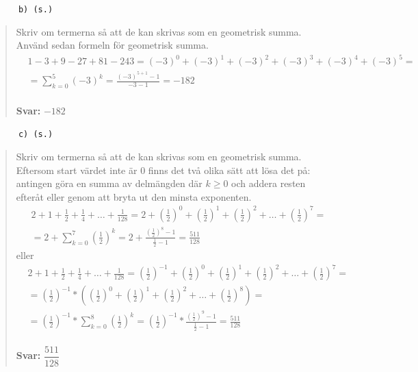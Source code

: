 \documentclass[a4paper]{article}
\newcommand{\tskcol}[1]{\textcolor{tskcol}{#1}}
\begin{document}
	\texttt{\tskcol{~~~~~~b) (s.)}}
	\begin{quotation}
		\noindent
		Skriv om termerna så att de kan skrivas som en geometrisk summa. Använd sedan formeln för geometrisk summa.
		\begin{align*}
		&1-3+9-27+81-243=
		(-3)^0+(-3)^1+(-3)^2+(-3)^3+(-3)^4+(-3)^5= \\
		&=\sum_{k=0}^{5}(-3)^k=
		\frac{(-3)^{5+1}-1}{-3-1}=
		-182
		\end{align*}
		\\
		\textbf{Svar:} $-182$
	\end{quotation}
	
	\texttt{\tskcol{~~~~~~c) (s.)}}
	\begin{quotation}
		\noindent
		Skriv om termerna så att de kan skrivas som en geometrisk summa. Eftersom start värdet inte är $0$ finns det två olika sätt att lösa det på: antingen göra en summa av delmängden där $k \ge 0$ och addera resten efteråt eller genom att bryta ut den minsta exponenten.
		\begin{align*}
		&2+1+\frac{1}{2}+\frac{1}{4}+\ldots+\frac{1}{128}=
		2+\left(\tfrac{1}{2}\right)^0+\left(\tfrac{1}{2}\right)^1+\left(\tfrac{1}{2}\right)^2+\ldots+\left(\tfrac{1}{2}\right)^7= \\
		&=2+\sum_{k=0}^{7}\left(\tfrac{1}{2}\right)^k=
		2+\frac{\left(\frac{1}{2}\right)^8-1}{\frac{1}{2}-1}=
		\frac{511}{128}
		\end{align*}
		eller \begin{align*}
		&2+1+\frac{1}{2}+\frac{1}{4}+\ldots+\frac{1}{128}=
		\left(\tfrac{1}{2}\right)^{-1}+\left(\tfrac{1}{2}\right)^0+\left(\tfrac{1}{2}\right)^1+\left(\tfrac{1}{2}\right)^2+\ldots+\left(\tfrac{1}{2}\right)^7= \\
		&=\left(\tfrac{1}{2}\right)^{-1}*\left(\left(\tfrac{1}{2}\right)^0+\left(\tfrac{1}{2}\right)^1+\left(\tfrac{1}{2}\right)^2+\ldots+\left(\tfrac{1}{2}\right)^8\right)= \\
		&=\left(\tfrac{1}{2}\right)^{-1}*\sum_{k=0}^{8}\left(\tfrac{1}{2}\right)^k=
		\left(\tfrac{1}{2}\right)^{-1}*\frac{\left(\frac{1}{2}\right)^9-1}{\frac{1}{2}-1}=
		\frac{511}{128}
		\end{align*}
		\\
		\textbf{Svar:} $\dfrac{511}{128}$
	\end{quotation}
	
\end{document}
